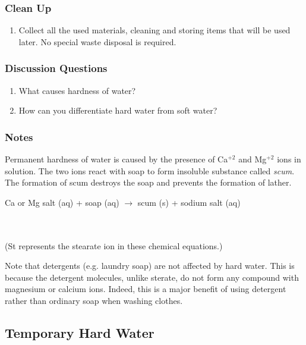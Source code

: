 \subsubsection*{Clean Up}
\begin{enumerate}
\item{Collect all the used materials, cleaning and storing items that will be used later. No special waste disposal is required.}
\end{enumerate}

\subsubsection*{Discussion Questions}
\begin{enumerate}
\item{What causes hardness of water?}
\item{How can you differentiate hard water from soft water?}
\end{enumerate}

\subsubsection*{Notes}
Permanent hardness of water is caused by the presence of Ca$^{+2}$ and Mg$^{+2}$ ions in solution. The two ions react with soap to form insoluble substance called \textit{scum}. The formation of scum destroys the soap and prevents the formation of lather. 
\begin{center}
Ca or Mg salt (aq) + soap (aq)  $\longrightarrow$ scum (s) + sodium salt (aq)\\
\\
\\
\end{center}
(St represents the stearate ion  in these chemical equations.)

Note that detergents (e.g. laundry soap) are not affected by hard water. This is because the detergent molecules, unlike sterate, do not form any compound with magnesium or calcium ions. Indeed, this is a major benefit of using detergent rather than ordinary soap when washing clothes.

\subsection{Temporary Hard Water}


